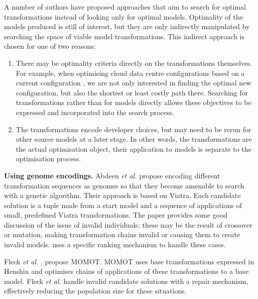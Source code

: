 		A number of authors have proposed approaches that aim to search for optimal transformations instead of looking only for optimal models. Optimality of the
		models produced is still of interest, but they are only indirectly manipulated by searching the space of viable model transformations. This indirect approach
		is chosen for one of two reasons: 
		\begin{enumerate}
			\item There may be optimality criteria directly on the transformations themselves. For example, when optimising cloud data centre configurations based on a
			      current configuration \cite{Chatziprimou+14}, we are not only interested in finding the optimal new configuration, but also the shortest or least
						costly path there. Searching for transformations rather than for models directly allows these objectives to be expressed and incorporated into the
						search process.
		  \item The transformations encode developer choices, but may need to be rerun for other source models at a later stage. In other words, the transformations
			      are the actual optimisation object, their application to models is separate to the optimisation process.
		\end{enumerate}
			
		\textbf{Using genome encodings.}
			Abdeen \emph{et al.} \cite{Abdeen+14} propose encoding different transformation sequences as genomes so that they become amenable to search
			with a genetic algorithm. Their approach is based on Viatra. Each candidate solution is a tuple made from a start model and a sequence of applications of
			small, predefined Viatra transformations. The paper provides some good discussion of the issue of invalid individuals: these may be the result of crossover
			or mutation, making transformation chains invalid or causing them to create invalid models. \cite{Abdeen+14} uses a specific ranking mechanism to handle
			these cases.
			
			Fleck \emph{et al.} \cite{Fleck+15}, propose MOMOT. MOMOT uses base transformations expressed in Henshin and optimises chains of applications of these
			transformations to a base model. Fleck \emph{et al.} handle invalid candidate solutions with a repair mechanism, effectively reducing the population size
			for these situations.
		
